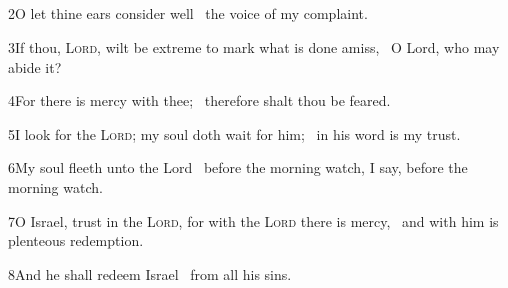 \subsection[{Psalm 130}]{}


2\enspace O let thine ears consider well \star\ the voice of my complaint.

3\enspace If thou, {\scshape Lord}, wilt be extreme to mark what is done amiss, \star\ O Lord, who may abide it?

4\enspace For there is mercy with thee; \star\ therefore shalt thou be feared.

5\enspace I look for the {\scshape Lord}; my soul doth wait for him; \star\ in his word is my trust.

6\enspace My soul fleeth unto the Lord \star\ before the morning watch, I say, before the morning watch.

7\enspace O Israel, trust in the {\scshape Lord}, for with the {\scshape Lord} there is mercy, \star\ and with him is plenteous redemption.

8\enspace And he shall redeem Israel \star\ from all his sins.

\medskip



